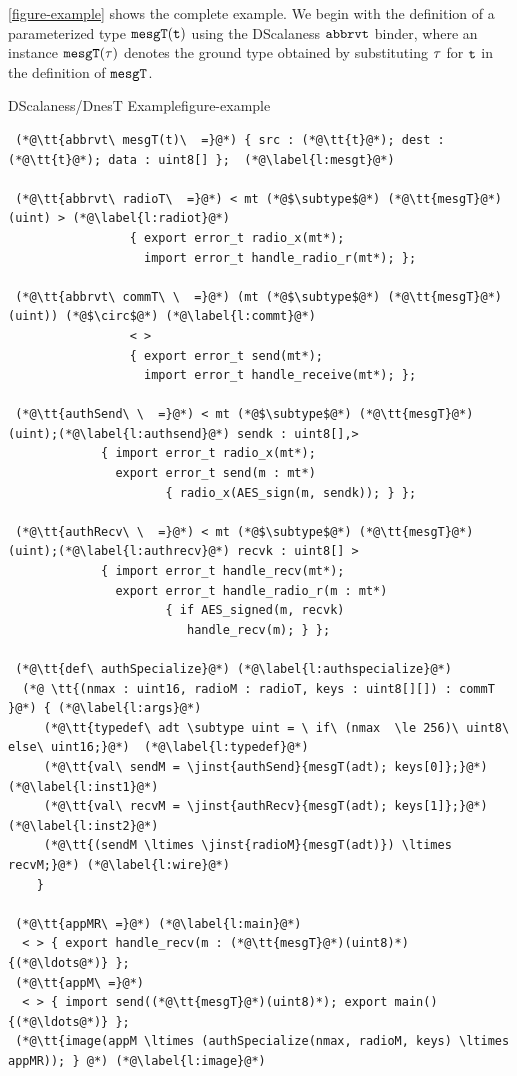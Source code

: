 \autoref{figure-example} shows the complete example. We begin with the definition of a
parameterized type $\tt{mesgT(t)}$ using the DScalaness $\tt{abbrvt}$ binder, where an instance
$\tt{mesgT}(\t)$ denotes the ground type obtained by substituting $\t$ for $\tt{t}$ in the
definition of $\tt{mesgT}$.

\begin{fpfig}[!p]{DScalaness/DnesT Example}{figure-example}
{
\singlespace
\lstset{numbers=left, numberstyle=\tiny, numbersep=0pt, basicstyle=\ttfamily}
\begin{lstlisting}
 (*@\tt{abbrvt\ mesgT(t)\  =}@*) { src : (*@\tt{t}@*); dest : (*@\tt{t}@*); data : uint8[] };  (*@\label{l:mesgt}@*)

 (*@\tt{abbrvt\ radioT\  =}@*) < mt (*@$\subtype$@*) (*@\tt{mesgT}@*)(uint) > (*@\label{l:radiot}@*)
                 { export error_t radio_x(mt*); 
                   import error_t handle_radio_r(mt*); };

 (*@\tt{abbrvt\ commT\ \  =}@*) (mt (*@$\subtype$@*) (*@\tt{mesgT}@*)(uint)) (*@$\circ$@*) (*@\label{l:commt}@*)
                 < >
                 { export error_t send(mt*); 
                   import error_t handle_receive(mt*); };

 (*@\tt{authSend\ \  =}@*) < mt (*@$\subtype$@*) (*@\tt{mesgT}@*)(uint);(*@\label{l:authsend}@*) sendk : uint8[],>  
             { import error_t radio_x(mt*);
               export error_t send(m : mt*) 
                      { radio_x(AES_sign(m, sendk)); } };

 (*@\tt{authRecv\ \  =}@*) < mt (*@$\subtype$@*) (*@\tt{mesgT}@*)(uint);(*@\label{l:authrecv}@*) recvk : uint8[] >  
             { import error_t handle_recv(mt*);
               export error_t handle_radio_r(m : mt*) 
                      { if AES_signed(m, recvk) 
                         handle_recv(m); } }; 

 (*@\tt{def\ authSpecialize}@*) (*@\label{l:authspecialize}@*)
  (*@ \tt{(nmax : uint16, radioM : radioT, keys : uint8[][]) : commT }@*) { (*@\label{l:args}@*)
     (*@\tt{typedef\ adt \subtype uint = \ if\ (nmax  \le 256)\ uint8\ else\ uint16;}@*)  (*@\label{l:typedef}@*) 
     (*@\tt{val\ sendM = \jinst{authSend}{mesgT(adt); keys[0]};}@*)  (*@\label{l:inst1}@*)
     (*@\tt{val\ recvM = \jinst{authRecv}{mesgT(adt); keys[1]};}@*)  (*@\label{l:inst2}@*)    
     (*@\tt{(sendM \ltimes \jinst{radioM}{mesgT(adt)}) \ltimes recvM;}@*) (*@\label{l:wire}@*)
    }

 (*@\tt{appMR\ =}@*) (*@\label{l:main}@*)
  < > { export handle_recv(m : (*@\tt{mesgT}@*)(uint8)*) {(*@\ldots@*)} }; 
 (*@\tt{appM\ =}@*) 
  < > { import send((*@\tt{mesgT}@*)(uint8)*); export main() {(*@\ldots@*)} };  
 (*@\tt{image(appM \ltimes (authSpecialize(nmax, radioM, keys) \ltimes appMR)); } @*) (*@\label{l:image}@*)  
\end{lstlisting}
\primaryspacing
}
\end{fpfig}

